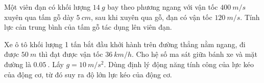 \begin{ex}
		Một viên đạn có khối lượng $\SI{14}{g}$ bay theo phương ngang với vận tốc $\SI{400}{m/s}$ xuyên qua tấm gỗ dày $\SI{5}{cm}$, sau khi xuyên qua gỗ, đạn có vận tốc $\SI{120}{m/s}$. Tính lực cản trung bình của tấm gỗ tác dụng lên viên đạn.
\end{ex}
\begin{ex}
	Xe ô tô khối lượng 1 tấn bắt đầu khởi hành trên đường thẳng nằm ngang, đi được $\SI{50}{m}$ thì đạt được vận tốc $\SI{36}{km/h}$. Cho hệ số ma sát giữa bánh xe và mặt đường là $\SI{0.05}{}$. Lấy $g=\SI{10}{m/s^2}$. Dùng định lý động năng tính công của lực kéo của động cơ, từ đó suy ra độ lớn lực kéo của động cơ.
\end{ex}

